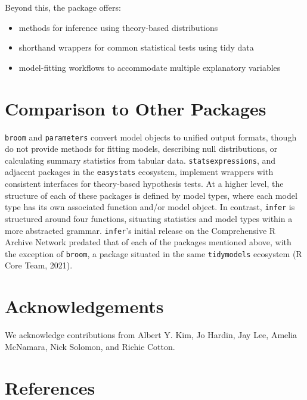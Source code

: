 \documentclass[10pt,a4paper,onecolumn]{article}
\providecommand{\tightlist}{%
  \setlength{\itemsep}{0pt}\setlength{\parskip}{0pt}}
\begin{document}
Beyond this, the package offers:

\begin{itemize}
\tightlist
\item
  methods for inference using theory-based distributions
\item
  shorthand wrappers for common statistical tests using tidy data
\item
  model-fitting workflows to accommodate multiple explanatory variables
\end{itemize}

\hypertarget{comparison-to-other-packages}{%
\section{Comparison to Other
Packages}\label{comparison-to-other-packages}}

\texttt{broom} and \texttt{parameters} convert model objects to unified
output formats, though do not provide methods for fitting models,
describing null distributions, or calculating summary statistics from
tabular data. \texttt{statsexpressions}, and adjacent packages in the
\texttt{easystats} ecosystem, implement wrappers with consistent
interfaces for theory-based hypothesis tests. At a higher level, the
structure of each of these packages is defined by model types, where
each model type has its own associated function and/or model object. In
contrast, \texttt{infer} is structured around four functions, situating
statistics and model types within a more abstracted grammar.
\texttt{infer}'s initial release on the Comprehensive R Archive Network
predated that of each of the packages mentioned above, with the
exception of \texttt{broom}, a package situated in the same
\texttt{tidymodels} ecosystem (R Core Team, 2021).

\hypertarget{acknowledgements}{%
\section{Acknowledgements}\label{acknowledgements}}

We acknowledge contributions from Albert Y. Kim, Jo Hardin, Jay Lee,
Amelia McNamara, Nick Solomon, and Richie Cotton.

\hypertarget{references}{%
\section*{References}\label{references}}
\end{document}
